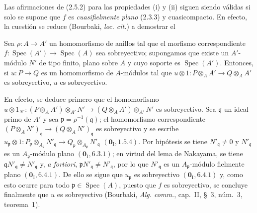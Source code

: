 \begin{remark}[2.5.4]
\label{IV.2.5.4-fr}
Las afirmaciones de (2.5.2) para las propiedades (i) y (ii) siguen siendo
válidas si solo se supone que $f$ es \emph{cuasifielmente plano} (2.3.3) y
cuasicompacto. En efecto, la cuestión se reduce (Bourbaki, \emph{loc. cit.}) a
demostrar el
\end{remark}

\begin{lemma}[2.5.4.1]
\label{IV.2.5.4.1-fr}
Sea $\rho:A\to A'$ un homomorfismo de anillos tal que el morfismo
correspondiente $f:\operatorname{Spec}(A')\to\operatorname{Spec}(A)$ sea
sobreyectivo; supongamos que existe un $A'$-módulo $N'$ de tipo finito, plano
sobre $A$ y cuyo soporte es $\operatorname{Spec}(A')$. Entonces, si
$u:P\to Q$ es un homomorfismo de $A$-módulos tal que
$u\otimes 1:P\otimes_A A'\longrightarrow Q\otimes_A A'$
es sobreyectivo, $u$ es sobreyectivo.
\end{lemma}

En efecto, se deduce primero que el homomorfismo
$u\otimes 1_{N'}:(P\otimes_A A')\otimes_{A'}N'
\longrightarrow(Q\otimes_A A')\otimes_{A'}N'$
es sobreyectivo. Sea $\mathfrak q$ un ideal primo de $A'$ y sea
$\mathfrak p=\rho^{-1}(\mathfrak q)$; el homomorfismo correspondiente
$(P\otimes_A N')_{\mathfrak q}\to(Q\otimes_A N')_{\mathfrak q}$ es
sobreyectivo y se escribe
$u_{\mathfrak p}\otimes 1:
P_{\mathfrak p}\otimes_{A_{\mathfrak p}}N'_{\mathfrak q}
\longrightarrow
Q_{\mathfrak p}\otimes_{A_{\mathfrak p}}N'_{\mathfrak q}$
$(\mathbf{0}_{\mathrm I},1.5.4)$.
Por hipótesis se tiene $N'_{\mathfrak q}\ne0$ y $N'_{\mathfrak q}$ es un
$A_{\mathfrak p}$-módulo plano $(\mathbf{0}_{\mathrm I},6.3.1)$; en virtud del lema de
Nakayama, se tiene
$\mathfrak qN'_{\mathfrak q}\ne N'_{\mathfrak q}$ y, \emph{a fortiori},
$\mathfrak pN'_{\mathfrak q}\ne N'_{\mathfrak q}$, por lo que
$N'_{\mathfrak q}$ es un $A_{\mathfrak p}$-módulo fielmente plano
$(\mathbf{0}_{\mathrm I},6.4.1)$. De ello se sigue que $u_{\mathfrak p}$ es
sobreyectivo $(\mathbf{0}_{\mathrm I},6.4.1)$ y, como esto ocurre para todo
$\mathfrak p\in\operatorname{Spec}(A)$, puesto que $f$ es sobreyectivo, se
concluye finalmente que $u$ es sobreyectivo (Bourbaki, \emph{Alg. comm.},
cap.~II, \S~3, núm.~3, teorema~1).

